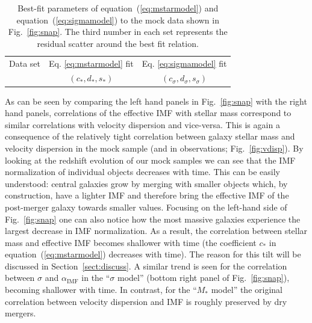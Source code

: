 \documentclass[usenatbib]{mnras}
\def\aimf{\alpha_{\mathrm{IMF}}}
\def\Sref#1{Section~\ref{#1}\xspace}
\def\Fref#1{Fig.~\ref{#1}\xspace}
\def\Eref#1{equation~(\ref{#1})\xspace}
\begin{document}
%
%
\begin{table}
 \caption{Best-fit parameters of \Eref{eq:mstarmodel} and \Eref{eq:sigmamodel} to the mock data shown in \Fref{fig:snap}. The third number in each set represents the residual scatter around the best fit relation.}
 \label{tab:oneparfit}
 \begin{tabular}{lcc}
 \hline
 Data set & Eq. \ref{eq:mstarmodel} fit & Eq. \ref{eq:sigmamodel} fit\\
 & $(c_*, d_*, s_*)$ & $(c_\sigma, d_\sigma, s_\sigma)$ \\
 \hline
 
 \hline
 \end{tabular}
\end{table}
%

As can be seen by comparing the left hand panels in \Fref{fig:snap}
with the right hand panels, correlations of the effective IMF
  with stellar mass correspond to similar correlations with velocity
  dispersion and vice-versa. This is again a consequence of the
  relatively tight correlation between galaxy stellar mass and
velocity dispersion in the mock sample (and in observations;
\Fref{fig:vdisp}).  By looking at the redshift evolution of our mock
samples we can see that the IMF normalization of individual objects
decreases with time. This can be easily understood: central galaxies
grow by merging with smaller objects which, by construction, have a
lighter IMF and therefore bring the effective IMF of the post-merger
galaxy towards smaller values.  Focusing on the left-hand side of
\Fref{fig:snap} one can also notice how the most massive galaxies
experience the largest decrease in IMF normalization. As a result, the
correlation between stellar mass and effective IMF becomes shallower
with time (the coefficient $c_*$ in \Eref{eq:mstarmodel} decreases with time). The reason for this tilt will be discussed in
\Sref{sect:discuss}.  %
A similar trend is seen for the correlation between $\sigma$ and $\aimf$ in the ``$\sigma$ model'' (bottom right panel of \Fref{fig:snap}), becoming shallower with time. In contrast, for the ``$M_*$ model'' the original correlation between velocity dispersion and IMF is roughly preserved by dry mergers.


\end{document}
